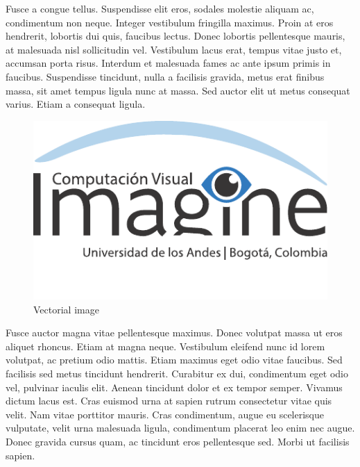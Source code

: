 \documentclass[10pt,twocolumn,letterpaper]{article}
\begin{document}
Fusce a congue tellus. Suspendisse elit eros, sodales molestie aliquam ac, condimentum non neque. Integer vestibulum fringilla maximus. Proin at eros hendrerit, lobortis dui quis, faucibus lectus. Donec lobortis pellentesque mauris, at malesuada nisl sollicitudin vel. Vestibulum lacus erat, tempus vitae justo et, accumsan porta risus. Interdum et malesuada fames ac ante ipsum primis in faucibus. Suspendisse tincidunt, nulla a facilisis gravida, metus erat finibus massa, sit amet tempus ligula nunc at massa. Sed auctor elit ut metus consequat varius. Etiam a consequat ligula.

\begin{figure}[t]
\begin{center}
   \includegraphics[width=0.8\linewidth]{imagine.pdf}
\end{center}
   \caption{Vectorial image}
\label{fig:long}
\label{fig:onecol}
\end{figure}


Fusce auctor magna vitae pellentesque maximus. Donec volutpat massa ut eros aliquet rhoncus. Etiam at magna neque. Vestibulum eleifend nunc id lorem volutpat, ac pretium odio mattis. Etiam maximus eget odio vitae faucibus. Sed facilisis sed metus tincidunt hendrerit. Curabitur ex dui, condimentum eget odio vel, pulvinar iaculis elit. Aenean tincidunt dolor et ex tempor semper. Vivamus dictum lacus est. Cras euismod urna at sapien rutrum consectetur vitae quis velit. Nam vitae porttitor mauris. Cras condimentum, augue eu scelerisque vulputate, velit urna malesuada ligula, condimentum placerat leo enim nec augue. Donec gravida cursus quam, ac tincidunt eros pellentesque sed. Morbi ut facilisis sapien.
\end{document}
